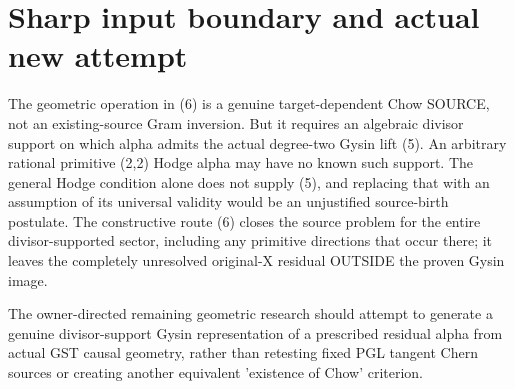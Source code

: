 \documentclass[11pt]{article}
\begin{document}
\section{Sharp input boundary and actual new attempt}
The geometric operation in (6) is a genuine
target-dependent Chow SOURCE, not an
existing-source Gram inversion. But it
requires an algebraic divisor support
on which alpha admits the actual
degree-two Gysin lift (5).
An arbitrary rational primitive
(2,2) Hodge alpha may have no
known such support. The general Hodge
condition alone does not supply (5),
and replacing that with an assumption
of its universal validity would be an
unjustified source-birth postulate.
The constructive route (6) closes
the source problem for the entire
divisor-supported sector, including
any primitive directions that occur
there; it leaves the completely
unresolved original-X residual OUTSIDE
the proven Gysin image.

The owner-directed remaining
geometric research should attempt
to generate a genuine divisor-support
Gysin representation of a prescribed
residual alpha from actual GST
causal geometry, rather than
retesting fixed PGL tangent Chern
sources or creating another
equivalent 'existence of Chow'
criterion.
\end{document}
